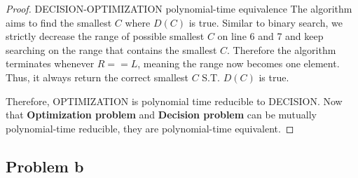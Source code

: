 \documentclass[openany]{article}
\begin{document}
\begin{proof}{}{DECISION-OPTIMIZATION polynomial-time equivalence}
The algorithm aims to find the smallest $C$ where $D(C)$ is true. Similar to binary search, we strictly decrease the range of possible smallest $C$ on line 6 and 7 and keep searching on the range that contains the smallest $C$. Therefore the algorithm terminates whenever $R==L$, meaning the range now becomes one element. Thus, it always return the correct smallest $C$ S.T. $D(C)$ is true.

Therefore,   OPTIMIZATION is polynomial time reducible to DECISION.
Now that \textbf{Optimization problem} and \textbf{Decision problem} can be mutually polynomial-time reducible, they are polynomial-time equivalent.
\end{proof}

\subsection*{Problem b}
\end{document}

